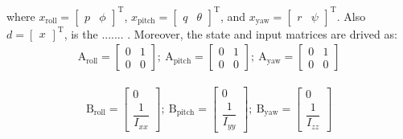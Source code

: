 \documentclass[conference]{IEEEtran}
\begin{document}
where $x_{\text{roll}} = \begin{bmatrix}
	p & \phi
\end{bmatrix}^\mathrm{T}$, $x_{\text{pitch}} = \begin{bmatrix}
	q & \theta \end{bmatrix}^\mathrm{T}$, and $x_{\text{yaw}} = \begin{bmatrix}
	r & \psi
\end{bmatrix}^\mathrm{T}$.
Also $d = \begin{bmatrix}
	x
\end{bmatrix}^\mathrm{T}$, is the ....... .
Moreover, the state and input matrices are drived as:
\begin{equation}
	\begin{split}
		\boldsymbol{\mathrm{A}}_{\text{roll}}  = \begin{bmatrix}
			0 & 1
			\\
			0 & 0
		\end{bmatrix};~ \boldsymbol{\mathrm{A}}_{\text{pitch}}  = \begin{bmatrix}
			0 & 1\\
			0 & 0
		\end{bmatrix};~ \boldsymbol{\mathrm{A}}_{\text{yaw}}  = \begin{bmatrix}
			0 & 1\\
			0 & 0
		\end{bmatrix}
	\end{split}
\end{equation}

\begin{equation}
	\begin{split}
		\boldsymbol{\mathrm{B}}_{\text{roll}}  = \begin{bmatrix}
			0
			\\[1em]
			\dfrac{1}{I_{xx}}
		\end{bmatrix};~ \boldsymbol{\mathrm{B}}_{\text{pitch}}  = \begin{bmatrix}
			0
			\\[1em]
			\dfrac{1}{I_{yy}}
		\end{bmatrix};~ \boldsymbol{\mathrm{B}}_{\text{yaw}}  = \begin{bmatrix}
			0
			\\[1em]
			\dfrac{1}{I_{zz}}
		\end{bmatrix}
	\end{split}
\end{equation}
\end{document}
